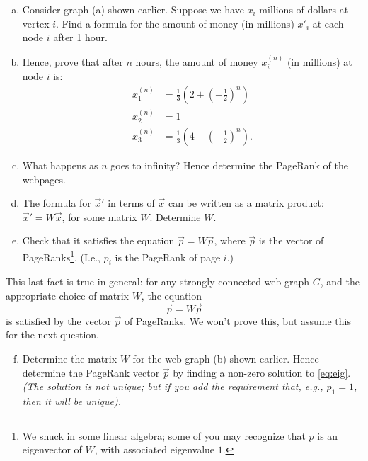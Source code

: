 \documentclass[11pt]{article}
\begin{document}
\begin{enumerate}[(a)]
\item Consider graph (a) shown earlier. Suppose we have $x_i$ millions of dollars at vertex $i$. Find a formula for the amount of money (in millions) $x'_i$ at each node $i$ after 1 hour.

\item Hence, prove that after $n$ hours, the amount of money $x^{(n)}_i$ (in millions) at node $i$ is:
    \begin{align*} x^{(n)}_1 &= \tfrac13\left(2+(-\tfrac12)^n\right)\\
                     x^{(n)}_2 &= 1\\
                     x^{(n)}_3 &= \tfrac13\left(4 - (-\tfrac12)^n\right).
\end{align*}
\item What happens as $n$ goes to infinity?  Hence determine the PageRank of the webpages.

\item The formula for $\vec{x}'$ in terms of $\vec{x}$ can be written as a matrix product: $\vec{x}' = W\vec{x}$, for some matrix $W$. Determine $W$.
\item Check that it satisfies the equation $\vec{p} = W\vec{p}$, where $\vec{p}$ is the vector of PageRanks\footnote{We snuck in some linear algebra; some of you may recognize that $p$ is an eigenvector of $W$, with associated eigenvalue $1$.}. (I.e., $p_i$ is the PageRank of page $i$.)
\end{enumerate}
This last fact is true in general: for any strongly connected web graph $G$, and the appropriate choice of matrix $W$, the equation
\begin{equation}\label{eq:eig} \vec{p} = W\vec{p} \end{equation}
is satisfied by the vector $\vec{p}$ of PageRanks. We won't prove this, but assume this for the next question.

\begin{center}
\end{center}
\begin{enumerate}[(a)]
        \setcounter{enumi}{5}

    \item Determine the matrix $W$ for the web graph (b) shown earlier. Hence determine the PageRank vector $\vec{p}$ by finding a non-zero solution to \eqref{eq:eig}. \emph{(The solution is not unique; but if you add the requirement that, e.g., $p_1 = 1$, then it will be unique).}

\end{enumerate}
\end{document}
